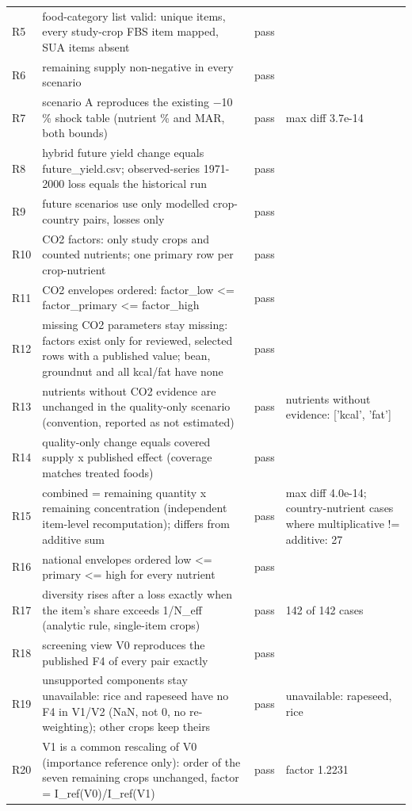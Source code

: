 \begin{longtable}{@{}lp{9.0cm}lp{3.8cm}@{}}
R5 & food-category list valid: unique items, every study-crop FBS item mapped, SUA items absent & pass &  \\
R6 & remaining supply non-negative in every scenario & pass &  \\
R7 & scenario A reproduces the existing $-$10 \% shock table (nutrient \% and MAR, both bounds) & pass & max diff 3.7e-14 \\
R8 & hybrid future yield change equals future\_yield.csv; observed-series 1971-2000 loss equals the historical run & pass &  \\
R9 & future scenarios use only modelled crop-country pairs, losses only & pass &  \\
R10 & CO2 factors: only study crops and counted nutrients; one primary row per crop-nutrient & pass &  \\
R11 & CO2 envelopes ordered: factor\_low <= factor\_primary <= factor\_high & pass &  \\
R12 & missing CO2 parameters stay missing: factors exist only for reviewed, selected rows with a published value; bean, groundnut and all kcal/fat have none & pass &  \\
R13 & nutrients without CO2 evidence are unchanged in the quality-only scenario (convention, reported as not estimated) & pass & nutrients without evidence: ['kcal', 'fat'] \\
R14 & quality-only change equals covered supply x published effect (coverage matches treated foods) & pass &  \\
R15 & combined = remaining quantity x remaining concentration (independent item-level recomputation); differs from additive sum & pass & max diff 4.0e-14; country-nutrient cases where multiplicative != additive: 27 \\
R16 & national envelopes ordered low <= primary <= high for every nutrient & pass &  \\
R17 & diversity rises after a loss exactly when the item's share exceeds 1/N\_eff (analytic rule, single-item crops) & pass & 142 of 142 cases \\
R18 & screening view V0 reproduces the published F4 of every pair exactly & pass &  \\
R19 & unsupported components stay unavailable: rice and rapeseed have no F4 in V1/V2 (NaN, not 0, no re-weighting); other crops keep theirs & pass & unavailable: rapeseed, rice \\
R20 & V1 is a common rescaling of V0 (importance reference only): order of the seven remaining crops unchanged, factor = I\_ref(V0)/I\_ref(V1) & pass & factor 1.2231 \\

\end{longtable}

